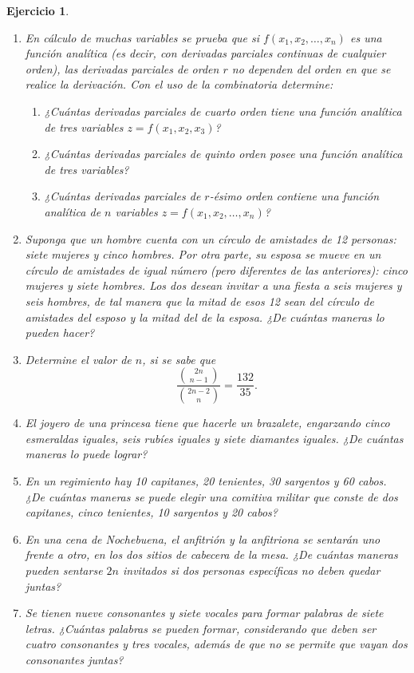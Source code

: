\documentclass[12pt,twoside]{article}
\newtheorem{Ejer}{Ejercicio}
\begin{document}
\begin{Ejer}
\begin{enumerate}
\item En cálculo de muchas variables se prueba que si $f(x_1,x_2,\dots,x_n)$ es una función analítica (es decir, con derivadas parciales continuas de cualquier orden), las derivadas parciales de orden $r$ no dependen del orden en que se realice la derivación. Con el uso de la combinatoria determine:
\begin{enumerate}
\item ¿Cuántas derivadas parciales de cuarto orden tiene una función analítica de tres variables $z=f(x_1,x_2,x_3)$?
\item ¿Cuántas derivadas parciales de quinto orden posee una función analítica de tres variables?
\item ¿Cuántas derivadas parciales de $r$-ésimo orden contiene una función analítica de $n$ variables $z=f(x_1,x_2,\dots,x_n)$?
\end{enumerate}

\item Suponga que un hombre cuenta con un círculo de amistades de 12 personas: siete mujeres y cinco hombres. Por otra parte, su esposa se mueve en un círculo de amistades de igual número (pero diferentes de las anteriores): cinco mujeres y siete hombres. Los dos desean invitar a una fiesta a seis mujeres y seis hombres, de tal manera que la mitad de esos 12 sean del círculo de amistades del esposo y la mitad del de la esposa. ¿De cuántas maneras lo pueden hacer?

\item Determine el valor de $n$, si se sabe que
\[
\frac{\binom{2n}{\,n-1\,}}{\binom{2n-2}{\,n\,}}=\frac{132}{35}.
\]

\item El joyero de una princesa tiene que hacerle un brazalete, engarzando cinco esmeraldas iguales, seis rubíes iguales y siete diamantes iguales. ¿De cuántas maneras lo puede lograr?

\item En un regimiento hay 10 capitanes, 20 tenientes, 30 sargentos y 60 cabos. ¿De cuántas maneras se puede elegir una comitiva militar que conste de dos capitanes, cinco tenientes, 10 sargentos y 20 cabos?

\item En una cena de Nochebuena, el anfitrión y la anfitriona se sentarán uno frente a otro, en los dos sitios de cabecera de la mesa. ¿De cuántas maneras pueden sentarse $2n$ invitados si dos personas específicas no deben quedar juntas?

\item Se tienen nueve consonantes y siete vocales para formar palabras de siete letras. ¿Cuántas palabras se pueden formar, considerando que deben ser cuatro consonantes y tres vocales, además de que no se permite que vayan dos consonantes juntas?


\end{enumerate}
\end{Ejer}
\end{document}
